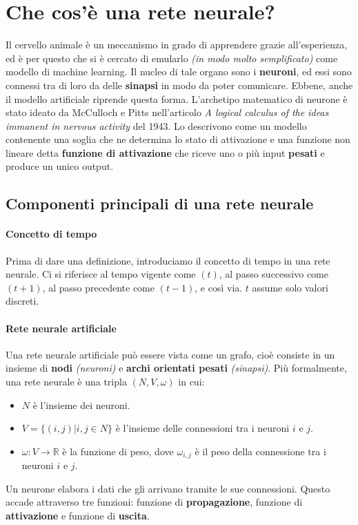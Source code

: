 \documentclass[12pt, twoside, letterpaper]{report}
\begin{document}
		\section{Che cos'è una rete neurale?}
			Il cervello animale è un meccanismo in grado di apprendere grazie all'esperienza, ed è per questo che si è cercato di emularlo \textit{(in modo molto semplificato)} come modello di machine learning. Il nucleo di tale organo sono i \textbf{neuroni}, ed essi sono connessi tra di loro da delle \textbf{sinapsi} in modo da poter comunicare. Ebbene, anche il modello artificiale riprende questa forma. L'archetipo matematico di neurone è stato ideato da McCulloch e Pitts nell'articolo \textit{A logical calculus of the ideas immanent in nervous activity} del 1943. Lo descrivono come un modello contenente una soglia che ne determina lo stato di attivazione e una funzione non lineare detta \textbf{funzione di attivazione} che riceve uno o più input \textbf{pesati} e produce un unico output.
			
		\subsection{Componenti principali di una rete neurale} 
			\paragraph{Concetto di tempo} Prima di dare una definizione, introduciamo il concetto di tempo in una rete neurale. Ci si riferisce al tempo vigente come $(t)$, al passo successivo come $(t+1)$, al passo precedente come $(t-1)$, e così via. $t$ assume solo valori discreti.
			
			\paragraph{Rete neurale artificiale}
			Una rete neurale artificiale può essere vista come un grafo, cioè consiste in un insieme di \textbf{nodi} \textit{(neuroni)} e \textbf{archi orientati pesati} \textit{(sinapsi)}. Più formalmente, una rete neurale è una tripla $(N,V, \omega)$ in cui:
			\begin{itemize}
				\item $N$ è l'insieme dei neuroni.
				\item $V = \{(i,j) | i,j \in N\}$ è l'insieme delle connessioni tra i neuroni $i$ e $j$. %
				\item $\omega: V \rightarrow \mathbb{R}$ è la funzione di peso, dove $\omega_{i,j}$ è il peso della connessione tra i neuroni $i$ e $j$. %
			\end{itemize}%
			Un neurone elabora i dati che gli arrivano tramite le sue connessioni. Questo accade attraverso tre funzioni: funzione di \textbf{propagazione}, funzione di \textbf{attivazione} e funzione di \textbf{uscita}.
			
\end{document}
